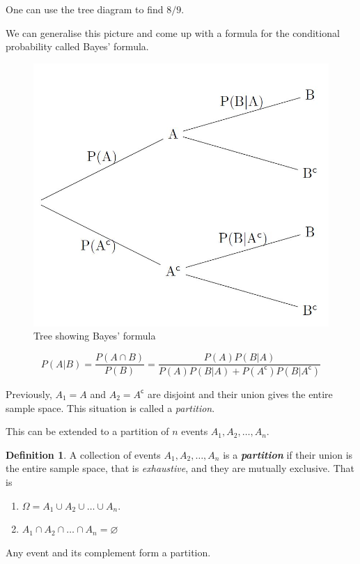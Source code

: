 \documentclass[
]{book}
\theoremstyle{definition}
\newtheorem{definition}{Definition}[chapter]
\theoremstyle{definition}
\theoremstyle{definition}
\theoremstyle{definition}
\theoremstyle{remark}
\begin{document}
One can use the tree diagram to find \(8/9\).

We can generalise this picture and come up with a formula for the conditional probability called Bayes' formula.

\begin{figure}

{\centering \includegraphics[width=11.31in]{./figures/condtree} 

}

\caption{Tree showing Bayes' formula}\label{fig:tree5}
\end{figure}

\[P(A|B) = \frac{P(A\cap B)}{P(B)} = \frac{P(A)P(B|A)}{P(A)P(B|A)+P(A^{\mathsf{c}})P(B|A^{\mathsf{c}})}\]

Previously, \(A_1=A\) and \(A_2 = A^{\mathsf{c}}\) are disjoint and their union gives the entire sample space. This situation is called a \emph{partition}.

This can be extended to a partition of \(n\) events \(A_1,A_2, \dots , A_n\).

\begin{definition}
A collection of events \(A_1, A_2, \dots , A_n\) is a \textbf{\emph{partition}} if their union is the entire sample space, that is \emph{exhaustive}, and they are mutually exclusive. That is

\begin{enumerate}
\def\labelenumi{\roman{enumi})}
\item
  \(\Omega = A_1 \cup A_2 \cup \dots \cup A_n\).
\item
  \(A_1 \cap A_2 \cap \dots \cap A_n = \varnothing\)
\end{enumerate}

Any event and its complement form a partition.
\end{definition}
\end{document}
